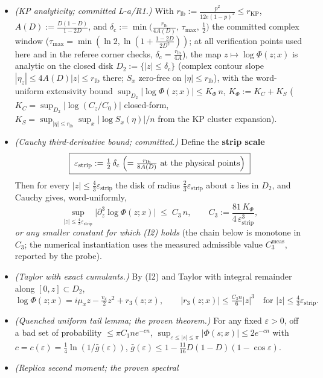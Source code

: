 \documentclass[
]{article}
\begin{document}
\begin{itemize}
\item[(I1)] \emph{(KP analyticity; committed L-a/R1.)}  With
$r_{\mathrm{lb}}:=\tfrac{p^2}{12e(1-p)^2}\le r_{\mathrm{KP}}$,
$A(D):=\tfrac{D(1-D)}{1-2D}$, and
$\delta_{\mathrm c}:=\min\!\bigl(\tfrac{r_{\mathrm{lb}}}{4A(D)},\,
\tau_{\max},\,\tfrac12\bigr)$ the committed complex window
($\tau_{\max}=\min(\ln2,\ln(1+\tfrac{1-2D}{2D^2}))$; at all
verification points used here and in the referee corner checks,
$\delta_{\mathrm c}=\tfrac{r_{\mathrm{lb}}}{4A}$),
the map $z\mapsto\log\Phi(z;x)$ is analytic on the closed disk
$D_2:=\{|z|\le\delta_{\mathrm c}\}$ (complex contour slope
$|\eta_z|\le4A(D)|z|\le r_{\mathrm{lb}}$ there; $S_x$ zero-free on
$|\eta|\le r_{\mathrm{lb}}$), with the word-uniform extensivity bound
$\sup_{D_2}|\log\Phi(z;x)|\le K_\Phi\,n$,
$K_\Phi:=K_C+K_S$ ($K_C=\sup_{D_2}|\log(C_z/C_0)|$ closed-form,
$K_S=\sup_{|\eta|\le r_{\mathrm{lb}}}\sup_x|\log S_x(\eta)|/n$ from the
KP cluster expansion).
\item[(I2)] \emph{(Cauchy third-derivative bound; committed.)}  Define
the \textbf{strip scale}
\[
  \boxed{\;\varepsilon_{\mathrm{strip}}:=\tfrac12\,\delta_{\mathrm c}
  \;\Bigl(=\tfrac{r_{\mathrm{lb}}}{8A(D)}\text{ at the physical
  points}\Bigr)\;}
\]
Then for every $|z|\le\tfrac43\varepsilon_{\mathrm{strip}}$ the disk of
radius $\tfrac23\varepsilon_{\mathrm{strip}}$ about $z$ lies in $D_2$,
and Cauchy gives, word-uniformly,
\[
  \tag{I2}
  \sup_{|z|\le\frac43\varepsilon_{\mathrm{strip}}}
  \bigl|\partial_z^3\log\Phi(z;x)\bigr|\;\le\;C_3\,n,
  \qquad
  C_3:=\frac{81\,K_\Phi}{4\,\varepsilon_{\mathrm{strip}}^{3}} ,
\]
\emph{or any smaller constant for which (I2) holds} (the chain below is
monotone in $C_3$; the numerical instantiation uses the measured
admissible value $C_3^{\mathrm{meas}}$, reported by the probe).
\item[(I3)] \emph{(Taylor with exact cumulants.)}  By (I2) and Taylor
with integral remainder along $[0,z]\subset D_2$,
\[
  \tag{I3}
  \log\Phi(z;x)=i\mu_x z-\tfrac{v_x}{2}z^2+r_3(z;x),\qquad
  |r_3(z;x)|\le\tfrac{C_3 n}{6}|z|^3
  \quad\text{for }|z|\le\tfrac43\varepsilon_{\mathrm{strip}} .
\]
\item[(I4)] \emph{(Quenched uniform tail lemma; the proven theorem.)}
For any fixed $\varepsilon>0$, off a bad set of probability $\le\pi
C_1ne^{-cn}$,
$\sup_{\varepsilon\le|s|\le\pi}|\Phi(s;x)|\le2e^{-cn}$ with
$c=c(\varepsilon)=\tfrac14\ln(1/\bar g(\varepsilon))$,
$\bar g(\varepsilon)\le1-\tfrac{11}{16}D(1-D)(1-\cos\varepsilon)$.
\item[(I5)] \emph{(Replica second moment; the proven spectral
}
\end{itemize}
\end{document}
